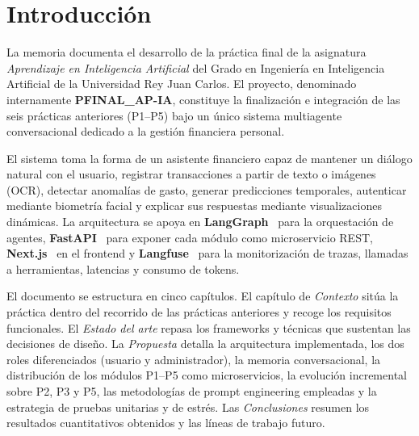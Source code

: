 \section{Introducción}
\label{sec:introduccion}

La memoria documenta el desarrollo de la práctica final de la
asignatura \textit{Aprendizaje en Inteligencia Artificial} del Grado en
Ingeniería en Inteligencia Artificial de la Universidad Rey Juan Carlos.
El proyecto, denominado internamente \textbf{PFINAL\_AP-IA}, constituye
la finalización e integración de las seis prácticas anteriores
(P1--P5) bajo un único sistema multiagente conversacional dedicado a la
gestión financiera personal.

El sistema toma la forma de un asistente financiero capaz de mantener
un diálogo natural con el usuario, registrar transacciones a partir de
texto o imágenes (OCR), detectar anomalías de gasto, generar
predicciones temporales, autenticar mediante biometría facial y
explicar sus respuestas mediante visualizaciones dinámicas. La
arquitectura se apoya en \textbf{LangGraph}~\cite{langgraph} para la
orquestación de agentes, \textbf{FastAPI}~\cite{fastapi} para exponer
cada módulo como microservicio REST, \textbf{Next.js}~\cite{nextjs}
en el frontend y \textbf{Langfuse}~\cite{langfuse} para la
monitorización de trazas, llamadas a herramientas, latencias y
consumo de tokens.

El documento se estructura en cinco capítulos. El capítulo de
\textit{Contexto} sitúa la práctica dentro del recorrido de las prácticas anteriores y
recoge los requisitos funcionales. El \textit{Estado del arte} repasa
los frameworks y técnicas que sustentan las decisiones de diseño. La
\textit{Propuesta} detalla la arquitectura implementada, los dos roles
diferenciados (usuario y administrador), la memoria conversacional, la
distribución de los módulos P1--P5 como microservicios, la evolución
incremental sobre P2, P3 y P5, las metodologías de prompt engineering
empleadas y la estrategia de pruebas unitarias y de estrés. Las
\textit{Conclusiones} resumen los resultados cuantitativos obtenidos y
las líneas de trabajo futuro.
